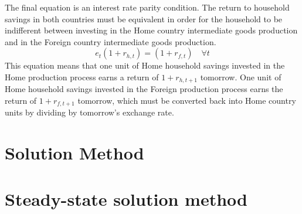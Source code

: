\documentclass[letterpaper,12pt]{article}
\theoremstyle{definition}
\begin{document}
  The final equation is an interest rate parity condition. The return to household savings in both countries must be equivalent in order for the household to be indifferent between investing in the Home country intermediate goods production and in the Foreign country intermediate goods production.
  \begin{equation}\label{EqLgOpenMC_rt}
    e_t(1 + r_{h,t}) = (1 + r_{f,t}) \quad\forall t
  \end{equation}
  This equation means that one unit of Home household savings invested in the Home production process earns a return of $1 + r_{h,t+1}$ tomorrow. One unit of Home household savings invested in the Foreign production process earns the return of $1 + r_{f,t+1}$ tomorrow, which must be converted back into Home country units by dividing by tomorrow's exchange rate.


\section{Solution Method}\label{SecLgOpenSol}


  \section{Steady-state solution method}\label{SecLgOpenSolSS}
\end{document}
